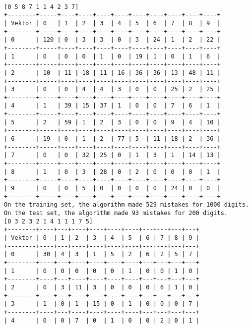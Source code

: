 \documentclass{article}
\begin{document}
\paragraph{}


\begin{lstlisting}[title=Beispielausgabe]
[0 5 8 7 1 1 4 2 3 7]
+--------+-----+----+----+----+----+----+----+----+----+----+
| Vektor | 0   | 1  | 2  | 3  | 4  | 5  | 6  | 7  | 8  | 9  |
+--------+-----+----+----+----+----+----+----+----+----+----+
| 0      | 120 | 0  | 3  | 3  | 0  | 3  | 24 | 1  | 2  | 22 |
+--------+-----+----+----+----+----+----+----+----+----+----+
| 1      | 0   | 0  | 0  | 1  | 0  | 19 | 1  | 0  | 1  | 6  |
+--------+-----+----+----+----+----+----+----+----+----+----+
| 2      | 10  | 11 | 18 | 11 | 16 | 36 | 36 | 13 | 48 | 11 |
+--------+-----+----+----+----+----+----+----+----+----+----+
| 3      | 0   | 0  | 4  | 4  | 3  | 0  | 0  | 25 | 2  | 25 |
+--------+-----+----+----+----+----+----+----+----+----+----+
| 4      | 1   | 39 | 15 | 37 | 1  | 0  | 0  | 7  | 6  | 1  |
+--------+-----+----+----+----+----+----+----+----+----+----+
| 5      | 2   | 59 | 1  | 2  | 3  | 0  | 0  | 9  | 4  | 10 |
+--------+-----+----+----+----+----+----+----+----+----+----+
| 6      | 19  | 0  | 1  | 2  | 77 | 5  | 11 | 18 | 2  | 36 |
+--------+-----+----+----+----+----+----+----+----+----+----+
| 7      | 0   | 0  | 32 | 25 | 0  | 1  | 3  | 1  | 14 | 13 |
+--------+-----+----+----+----+----+----+----+----+----+----+
| 8      | 1   | 0  | 3  | 28 | 0  | 2  | 0  | 0  | 0  | 1  |
+--------+-----+----+----+----+----+----+----+----+----+----+
| 9      | 0   | 0  | 5  | 0  | 0  | 0  | 0  | 24 | 0  | 0  |
+--------+-----+----+----+----+----+----+----+----+----+----+
On the training set, the algorithm made 529 mistakes for 1000 digits.
On the test set, the algorithm made 93 mistakes for 200 digits.
[0 3 2 3 2 1 4 1 1 1 7 5]
+--------+----+---+----+----+----+----+---+---+---+---+
| Vektor | 0  | 1 | 2  | 3  | 4  | 5  | 6 | 7 | 8 | 9 |
+--------+----+---+----+----+----+----+---+---+---+---+
| 0      | 30 | 4 | 3  | 1  | 5  | 2  | 6 | 2 | 5 | 7 |
+--------+----+---+----+----+----+----+---+---+---+---+
| 1      | 0  | 0 | 0  | 0  | 0  | 1  | 0 | 0 | 1 | 0 |
+--------+----+---+----+----+----+----+---+---+---+---+
| 2      | 0  | 3 | 11 | 3  | 0  | 0  | 0 | 6 | 1 | 0 |
+--------+----+---+----+----+----+----+---+---+---+---+
| 3      | 1  | 0 | 1  | 15 | 0  | 1  | 0 | 0 | 0 | 7 |
+--------+----+---+----+----+----+----+---+---+---+---+
| 4      | 0  | 0 | 7  | 0  | 1  | 0  | 0 | 2 | 0 | 1 |

\end{lstlisting}
\end{document}
